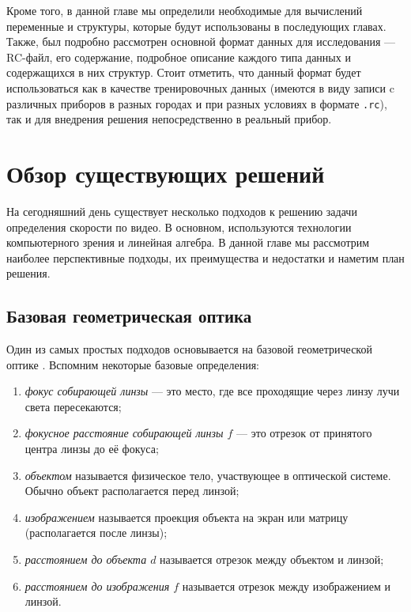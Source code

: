 \documentclass[specification,annotation,times]{itmo-student-thesis}
\begin{document}
Кроме того, в данной главе мы определили необходимые для вычислений переменные и структуры, которые будут использованы в последующих главах. Также, был подробно рассмотрен основной формат данных для исследования --- RC-файл, его содержание, подробное описание каждого типа данных и содержащихся в них структур. Стоит отметить, что данный формат будет использоваться как в качестве тренировочных данных (имеются в виду записи c различных приборов в разных городах и при разных условиях в формате \texttt{.rc}), так и для внедрения решения непосредственно в реальный прибор.

\chapter{Обзор существующих решений}\label{chp2}
На сегодняшний день существует несколько подходов к решению задачи определения скорости по видео. В основном, используются технологии компьютерного зрения и линейная алгебра. В данной главе мы рассмотрим наиболее перспективные подходы, их преимущества и недостатки и наметим план решения.
\startrelatedwork
\section{Базовая геометрическая оптика} \label{sec:base-optics}
Один из самых простых подходов \cite{5228496} основывается на базовой геометрической оптике \cite{Wilkinson2012}. Вспомним некоторые базовые определения:

\begin{enumerate}
	\item \textit{фокус собирающей линзы} --- это место, где все проходящие через линзу лучи света пересекаются;
	\item \textit{фокусное расстояние собирающей линзы $ f $} --- это  отрезок от принятого центра линзы до её фокуса;
	\item \textit{объектом}  называется физическое тело, участвующее в оптической системе. Обычно объект располагается перед линзой;
	\item \textit{изображением}  называется проекция объекта на экран или матрицу (располагается после линзы);
	\item \textit{расстоянием до объекта $ d $} называется отрезок между объектом и линзой;
	\item \textit{расстоянием до изображения $ f $} называется отрезок между изображением и линзой.
\end{enumerate}
\end{document}
